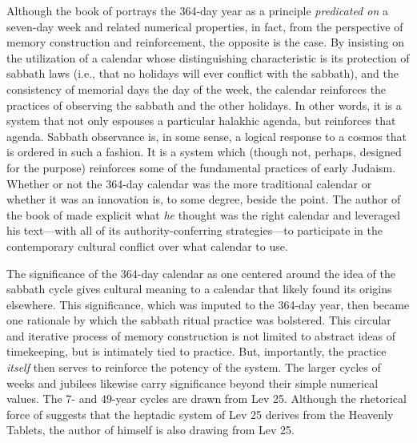 Although the book of \jub portrays the 364-day year as a principle \emph{predicated on} a seven-day week and related numerical properties, in fact, from the perspective of memory construction and reinforcement, the opposite is the case. By insisting on the utilization of a calendar whose distinguishing characteristic is its protection of sabbath laws (i.e., that no holidays will ever conflict with the sabbath), and the consistency of memorial days \visavis the day of the week, the calendar reinforces the practices of observing the sabbath and the other holidays. In other words, it is a system that not only espouses a particular halakhic agenda, but reinforces that agenda. Sabbath observance is, in some sense, a logical response to a cosmos that is ordered in such a fashion. It is a system which (though not, perhaps, designed for the purpose) reinforces some of the fundamental practices of early Judaism. Whether or not the 364-day calendar was the more traditional calendar or whether it was an innovation is, to some degree, beside the point. The author of the book of \jub made explicit what \emph{he} thought was the right calendar and leveraged his text---with all of its authority-conferring strategies---to participate in the contemporary cultural conflict over what calendar to use. 

The significance of the 364-day calendar as one centered around the idea of the sabbath cycle gives cultural meaning to a calendar that likely found its origins elsewhere. This significance, which was imputed to the 364-day year, then became one rationale by which the sabbath ritual practice was bolstered.%
    \autocite{fraade_dine-israel2010}
This circular and iterative process of memory construction is not limited to abstract ideas of timekeeping, but is intimately tied to practice. But, importantly, the practice \emph{itself} then serves to reinforce the potency of the system. 
The larger cycles of weeks and jubilees likewise carry significance beyond their simple numerical values. The 7- and 49-year cycles are drawn from Lev 25. Although the rhetorical force of \jub suggests that the heptadic system of Lev 25 derives from the Heavenly Tablets, the author of \jub himself is also drawing from Lev 25. 


